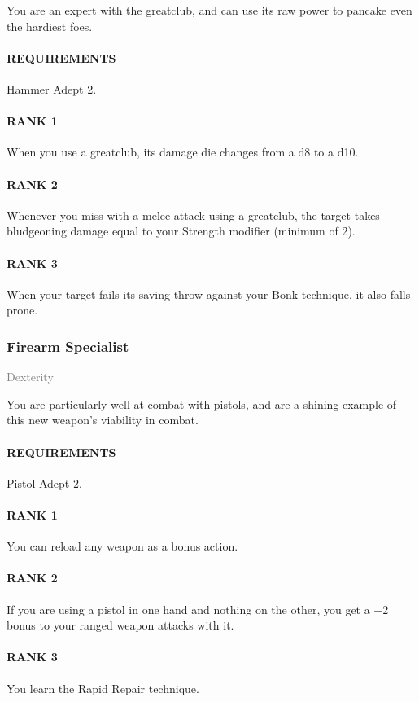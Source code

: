 \normalsize
You are an expert with the greatclub, and can use its raw power to pancake even the hardiest foes.
\paragraph{REQUIREMENTS} Hammer Adept 2.
\paragraph{RANK 1} When you use a greatclub, its damage die changes from a d8 to a d10.
\paragraph{RANK 2} Whenever you miss with a melee attack using a greatclub, the target takes bludgeoning damage equal to your Strength modifier (minimum of 2).
\paragraph{RANK 3} When your target fails its saving throw against your Bonk technique, it also falls prone.

\subsubsection{Firearm Specialist} \label{feat::firearmspecialist}
\small{\textcolor{gray}{Dexterity}}

\normalsize
You are particularly well at combat with pistols, and are a shining example of this new weapon's viability in combat.
\paragraph{REQUIREMENTS} Pistol Adept 2.
\paragraph{RANK 1} You can reload any weapon as a bonus action.
\paragraph{RANK 2} If you are using a pistol in one hand and nothing on the other, you get a +2 bonus to your ranged weapon attacks with it.
\paragraph{RANK 3} You learn the Rapid Repair technique.


